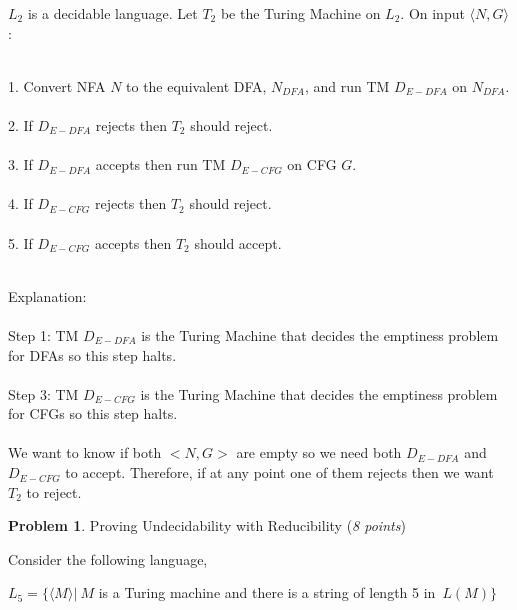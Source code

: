 \documentclass[11pt]{article}
\theoremstyle{definition}
\theoremstyle{theorem}
\newtheorem{prob}{Problem}
\newcommand{\solution}{\medskip\noindent{\color{blue}\textbf{Solution:}}}
\begin{document}
\begin{enumerate}[label=(\alph*)]
\solution 

$L_2$ is a decidable language. Let $T_2$ be the Turing Machine on $L_2$. On input $\langle N, G \rangle$: \\~\\
\begin{minipage}{.9\textwidth}
	1. Convert NFA $N$ to the equivalent DFA, $N_{DFA}$, and run TM $D_{E-DFA}$ on $N_{DFA}$. \\~\\
	2. If $D_{E-DFA}$ rejects then $T_2$ should reject. \\~\\
	3. If $D_{E-DFA}$ accepts then run TM $D_{E-CFG}$ on CFG $G$. \\~\\
	4. If $D_{E-CFG}$ rejects then $T_2$ should reject. \\~\\
	5. If $D_{E-CFG}$ accepts then $T_2$ should accept. \\~\\
\end{minipage}

Explanation:\\~\\
Step 1: TM $D_{E-DFA}$ is the Turing Machine that decides the emptiness problem for DFAs so this step halts. \\~\\
Step 3: TM $D_{E-CFG}$ is the Turing Machine that decides the emptiness problem for CFGs so this step halts. \\~\\
We want to know if both $<N, G>$ are empty so we need both $D_{E-DFA}$ and $D_{E-CFG}$ to accept. Therefore, if at any point one of them rejects then we want $T_2$ to reject.









\end{enumerate}


\newpage

\begin{prob} Proving Undecidability with Reducibility (\emph{8 points})\end{prob}

Consider the following language, 

$L_{5} = \{\langle M \rangle | ~M $  is a Turing machine and there is a string of length 5 in~$ L(M)\}$\\
\end{document}
